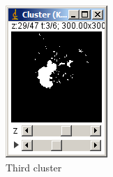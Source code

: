 \documentclass[11pt]{article} %
\begin{document}
\begin{figure}
\begin{subfigure}[b]{0.3\textwidth}
                \includegraphics[width=\textwidth]{figures/k-means_results_3}
                \caption{Third cluster}
                \label{fig:k-means_res_3}
	\end{subfigure}%
	 \\
        \begin{subfigure}[b]{0.3\textwidth}
                \centering

\end{subfigure}
\end{figure}
\end{document}
